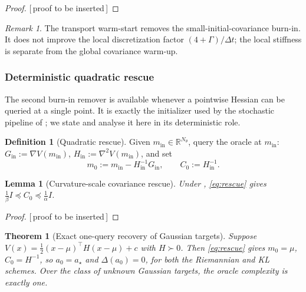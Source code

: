 \documentclass[11pt]{article}
\theoremstyle{plain}
\newtheorem{theorem}{Theorem}[section]
\newtheorem{lemma}[lemma]{Lemma}
\theoremstyle{definition}
\newtheorem{definition}[definition]{Definition}
\theoremstyle{remark}
\newtheorem{remark}[remark]{Remark}
\newcommand{\R}{\mathbb{R}}
\newcommand{\Id}{I}
\newcommand{\PROOFHOLE}{{\color{red}\textsf{[\,proof to be inserted\,]}}}
\begin{document}
\begin{proof}
\PROOFHOLE
\end{proof}

\begin{remark}
\label{rem:transport-caveat}
The transport warm-start removes the small-initial-covariance burn-in. It does not improve the
local discretization factor $(4+\Gamma)/\Delta t$; the local stiffness is separate from the global
covariance warm-up.
\end{remark}

\subsubsection{Deterministic quadratic rescue}
\label{subsec:rescue-det}

The second burn-in remover is available whenever a pointwise Hessian can be queried at a single
point. It is exactly the initializer used by the stochastic pipeline of ;
we state and analyse it here in its deterministic role.

\begin{definition}[Quadratic rescue]
\label{def:rescue}
Given $m_{\mathrm{in}}\in\R^{N_\theta}$, query the oracle at $m_{\mathrm{in}}$:
$G_{\mathrm{in}}:=\nabla V(m_{\mathrm{in}})$, $H_{\mathrm{in}}:=\nabla^2V(m_{\mathrm{in}})$, and set
\begin{equation}
\label{eq:rescue}
    \boxed{\;
    m_0:=m_{\mathrm{in}}-H_{\mathrm{in}}^{-1}G_{\mathrm{in}},
    \qquad
    C_0:=H_{\mathrm{in}}^{-1}.
    \;}
\end{equation}
\end{definition}

\begin{lemma}[Curvature-scale covariance rescue]
\label{lem:rescue-band}
Under , \eqref{eq:rescue} gives $\tfrac1\beta\Id\preceq C_0\preceq\tfrac1\alpha\Id$.
\end{lemma}

\begin{proof}
\PROOFHOLE
\end{proof}

\begin{theorem}[Exact one-query recovery of Gaussian targets]
\label{thm:gauss-recovery}
Suppose $V(x)=\tfrac12(x-\mu)^\top H(x-\mu)+c$ with $H\succ0$. Then \eqref{eq:rescue} gives $m_0=\mu$,
$C_0=H^{-1}$, so $a_0=a_\star$ and $\Delta(a_0)=0$, for both the Riemannian and KL schemes. Over the
class of unknown Gaussian targets, the oracle complexity is exactly one.
\end{theorem}
\end{document}
